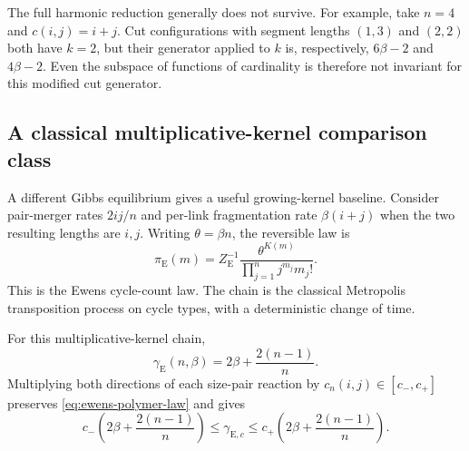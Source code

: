 The full harmonic reduction generally does not survive.
For example, take $n=4$ and $c(i,j)=i+j$.
Cut configurations with segment lengths $(1,3)$ and $(2,2)$ both have
$k=2$, but their generator applied to $k$ is, respectively,
$6\beta-2$ and $4\beta-2$.
Even the subspace of functions of cardinality is therefore not
invariant for this modified cut generator.

\subsection{A classical multiplicative-kernel comparison class}

A different Gibbs equilibrium gives a useful growing-kernel baseline.
Consider pair-merger rates $2ij/n$ and per-link fragmentation rate
$\beta(i+j)$ when the two resulting lengths are $i,j$.
Writing $\theta=\beta n$, the reversible law is
\begin{equation}\label{eq:ewens-polymer-law}
 \pi_{\mathrm E}(m)=Z_{\mathrm E}^{-1}
    \frac{\theta^{K(m)}}{\prod_{j=1}^n j^{m_j}m_j!}.
\end{equation}
This is the Ewens cycle-count law.
The chain is the classical Metropolis transposition process on
cycle types, with a deterministic change of time.

\begin{proposition}
\label{prop:ewens-classical}
For this multiplicative-kernel chain,
\begin{equation}\label{eq:ewens-gap}
 \gamma_{\mathrm E}(n,\beta)=2\beta+\frac{2(n-1)}n.
\end{equation}
Multiplying both directions of each size-pair reaction by
$c_n(i,j)\in[c_-,c_+]$ preserves \eqref{eq:ewens-polymer-law} and gives
\[
 c_-\left(2\beta+\frac{2(n-1)}n\right)
 \le\gamma_{\mathrm E,c}\le
 c_+\left(2\beta+\frac{2(n-1)}n\right).
\]
\end{proposition}


